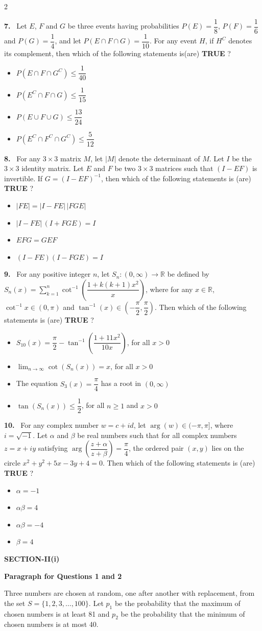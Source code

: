 \documentclass[10pt]{extarticle}
\newcommand{\sect}[1]{\par\smallskip\noindent\textbf{#1}\par}
\newcommand{\qn}[1]{\par\smallskip\noindent\textbf{#1.}~}
\newcommand{\paraq}[2]{\par\smallskip\noindent\textbf{Paragraph for Questions #1 and #2}\par}
\newenvironment{qoptions}{\begin{itemize}[leftmargin=1.8em,itemsep=1pt,topsep=2pt,label={}]}{\end{itemize}}
\newcommand{\opt}[2]{\item[(#1)] #2}
\begin{document}
\begin{multicols}{2}
\qn{7} Let $E$, $F$ and $G$ be three events having probabilities $P(E)=\dfrac18$, $P(F)=\dfrac16$ and $P(G)=\dfrac14$, and let $P(E\cap F\cap G)=\dfrac1{10}$. For any event $H$, if $H^C$ denotes its complement, then which of the following statements is(are) \textbf{TRUE} ?
\begin{qoptions}
\opt{A}{$P(E\cap F\cap G^C)\le\dfrac1{40}$}
\opt{B}{$P(E^C\cap F\cap G)\le\dfrac1{15}$}
\opt{C}{$P(E\cup F\cup G)\le\dfrac{13}{24}$}
\opt{D}{$P(E^C\cap F^C\cap G^C)\le\dfrac5{12}$}
\end{qoptions}

\qn{8} For any $3\times3$ matrix $M$, let $|M|$ denote the determinant of $M$. Let $I$ be the $3\times3$ identity matrix. Let $E$ and $F$ be two $3\times3$ matrices such that $(I-EF)$ is invertible. If $G=(I-EF)^{-1}$, then which of the following statements is (are) \textbf{TRUE} ?
\begin{qoptions}
\opt{A}{$|FE|=|I-FE|\,|FGE|$}
\opt{B}{$|I-FE|\,(I+FGE)=I$}
\opt{C}{$EFG=GEF$}
\opt{D}{$(I-FE)(I-FGE)=I$}
\end{qoptions}

\qn{9} For any positive integer $n$, let $S_n:(0,\infty)\to\mathbb R$ be defined by $S_n(x)=\displaystyle\sum_{k=1}^{n}\cot^{-1}\!\left(\dfrac{1+k(k+1)x^2}{x}\right)$, where for any $x\in\mathbb R$, $\cot^{-1}x\in(0,\pi)$ and $\tan^{-1}(x)\in\left(-\dfrac\pi2,\dfrac\pi2\right)$. Then which of the following statements is (are) \textbf{TRUE} ?
\begin{qoptions}
\opt{A}{$S_{10}(x)=\dfrac\pi2-\tan^{-1}\!\left(\dfrac{1+11x^2}{10x}\right)$, for all $x>0$}
\opt{B}{$\displaystyle\lim_{n\to\infty}\cot(S_n(x))=x$, for all $x>0$}
\opt{C}{The equation $S_3(x)=\dfrac\pi4$ has a root in $(0,\infty)$}
\opt{D}{$\tan(S_n(x))\le\dfrac12$, for all $n\ge1$ and $x>0$}
\end{qoptions}

\qn{10} For any complex number $w=c+id$, let $\arg(w)\in(-\pi,\pi]$, where $i=\sqrt{-1}$. Let $\alpha$ and $\beta$ be real numbers such that for all complex numbers $z=x+iy$ satisfying $\arg\!\left(\dfrac{z+\alpha}{z+\beta}\right)=\dfrac\pi4$, the ordered pair $(x,y)$ lies on the circle $x^2+y^2+5x-3y+4=0$. Then which of the following statements is (are) \textbf{TRUE} ?
\begin{qoptions}
\opt{A}{$\alpha=-1$}
\opt{B}{$\alpha\beta=4$}
\opt{C}{$\alpha\beta=-4$}
\opt{D}{$\beta=4$}
\end{qoptions}

\sect{SECTION-II(i)}
\paraq{1}{2}
Three numbers are chosen at random, one after another with replacement, from the set $S=\{1,2,3,\dots,100\}$. Let $p_1$ be the probability that the maximum of chosen numbers is at least 81 and $p_2$ be the probability that the minimum of chosen numbers is at most 40.


\end{multicols}
\end{document}

